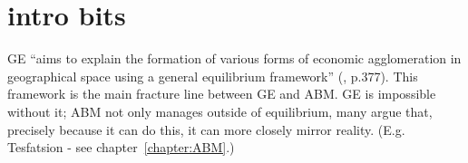 \section{intro bits}

GE ``aims to explain the formation of various forms of economic agglomeration in geographical space using a general equilibrium framework'' (\citealt{fujita_frontiers_2005}, p.377). This framework is the main fracture line between GE and ABM. GE is impossible without it; ABM not only manages outside of equilibrium, many argue that, precisely because it can do this, it can more closely mirror reality. (E.g. Tesfatsion  - see chapter~\ref{chapter:ABM}.)  